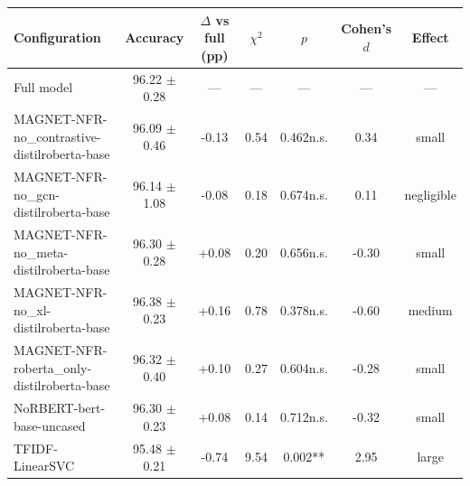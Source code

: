 \begin{tabular}{@{}lcccccc@{}}
\toprule
\textbf{Configuration} & \textbf{Accuracy} & \textbf{$\Delta$ vs full (pp)} & \textbf{$\chi^2$} & \textbf{$p$} & \textbf{Cohen's $d$} & \textbf{Effect}\\
\midrule
Full model & 96.22 $\pm$ 0.28 & --- & --- & --- & --- & ---\\
MAGNET-NFR-no\_contrastive-distilroberta-base & 96.09 $\pm$ 0.46 & -0.13 & 0.54 & 0.462n.s. & 0.34 & small\\
MAGNET-NFR-no\_gcn-distilroberta-base & 96.14 $\pm$ 1.08 & -0.08 & 0.18 & 0.674n.s. & 0.11 & negligible\\
MAGNET-NFR-no\_meta-distilroberta-base & 96.30 $\pm$ 0.28 & +0.08 & 0.20 & 0.656n.s. & -0.30 & small\\
MAGNET-NFR-no\_xl-distilroberta-base & 96.38 $\pm$ 0.23 & +0.16 & 0.78 & 0.378n.s. & -0.60 & medium\\
MAGNET-NFR-roberta\_only-distilroberta-base & 96.32 $\pm$ 0.40 & +0.10 & 0.27 & 0.604n.s. & -0.28 & small\\
NoRBERT-bert-base-uncased & 96.30 $\pm$ 0.23 & +0.08 & 0.14 & 0.712n.s. & -0.32 & small\\
TFIDF-LinearSVC & 95.48 $\pm$ 0.21 & -0.74 & 9.54 & 0.002** & 2.95 & large\\
\bottomrule
\end{tabular}